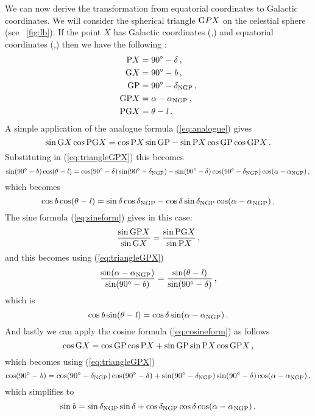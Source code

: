 We can now derive the transformation from equatorial coordinates to
Galactic coordinates. We will consider the spherical triangle $\textnormal{G} P
X$ on the celestial sphere (see \figurename~\ref{fig:lb}). If the
point $X$ has Galactic coordinates (\gall,\galb) and equatorial
coordinates (\ra,\dec) then we have the following \citep{Green85a}:
\begin{align}\label{eq:triangleGPX}
\textnormal{P} X &= 90^{\circ}-\delta\, ,\\
\textnormal{G} X &= 90^{\circ} - {\it b}\, ,\\
\textnormal{G}\textnormal{P} &= 90^{\circ}-\delta_{\textnormal{NGP}}\, ,\\
\textnormal{G} \textnormal{P} X &= \alpha-\alpha_{\textnormal{NGP}}\, ,\\
\textnormal{P} \textnormal{G} X &= \theta-{\it l}\, .
\end{align}
A simple application of the analogue formula (\ref{eq:analogue}) gives
\begin{equation}
\sin \textnormal{G} X \cos \textnormal{P} \textnormal{G} X = \cos \textnormal{P} X \sin \textnormal{G} \textnormal{P} - \sin \textnormal{P} X \cos \textnormal{G} \textnormal{P}  \cos \textnormal{G} \textnormal{P} X\, .\\
\end{equation}
Substituting in (\ref{eq:triangleGPX}) this becomes
\begin{equation}
\sin(90^{\circ} - {\it b}) \cos(\theta-{\it l}) = \cos(90^{\circ}-\delta) \sin(90^{\circ}-\delta_{\textnormal{NGP}}) - \sin(90^{\circ}-\delta) \cos(90^{\circ}-\delta_{\textnormal{NGP}}) \cos(\alpha-\alpha_{\textnormal{NGP}})\, ,\\
\end{equation}
which becomes
\begin{equation}\label{eq:radectolb1}
\cos{\it b} \cos(\theta-{\it l}) = \sin\delta \cos\delta_{\textnormal{NGP}} - \cos\delta \sin\delta_{\textnormal{NGP}} \cos(\alpha-\alpha_{\textnormal{NGP}})\, .
\end{equation}
The sine formula (\ref{eq:sineform}) gives in this case:
\begin{equation}
\frac{\sin \textnormal{G} \textnormal{P} X}{\sin \textnormal{G} X} = \frac{\sin \textnormal{P} \textnormal{G} X}{\sin \textnormal{P} X}\, ,
\end{equation}
and this becomes using (\ref{eq:triangleGPX})
\begin{equation}
\frac{\sin(\alpha-\alpha_{\textnormal{NGP}})}{\sin(90^{\circ} - {\it b})} = \frac{\sin(\theta-{\it l})}{\sin(90^{\circ}-\delta)}\, ,
\end{equation}
which is
\begin{equation}\label{eq:radectolb2}
\cos {\it b} \sin(\theta-{\it l})=\cos \delta \sin (\alpha-\alpha_{\textnormal{NGP}})\, .
\end{equation}
And lastly we can apply the cosine formula (\ref{eq:cosineform}) as follows
\begin{equation}
\cos \textnormal{G} X = \cos \textnormal{G} \textnormal{P}  \cos \textnormal{P} X + \sin \textnormal{G} \textnormal{P} \sin \textnormal{P} X \cos \textnormal{G} \textnormal{P} X\, ,
\end{equation}
which becomes using (\ref{eq:triangleGPX})
\begin{equation}
\cos (90^{\circ} - {\it b}) = \cos(90^{\circ}-\delta_{\textnormal{NGP}}) \cos(90^{\circ}-\delta) + \sin(90^{\circ}-\delta_{\textnormal{NGP}}) \sin(90^{\circ}-\delta) \cos(\alpha-\alpha_{\textnormal{NGP}})\, ,
\end{equation}
which simplifies to
\begin{equation}\label{eq:radectolb3}
\sin {\it b} = \sin \delta_{\textnormal{NGP}} \sin \delta + \cos\delta_{\textnormal{NGP}} \cos\delta \cos(\alpha-\alpha_{\textnormal{NGP}})\, .
\end{equation}

